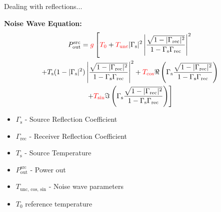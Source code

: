\documentclass[aspectratio=169]{beamer}
\begin{document}
\begin{frame}{\small{Dealing with reflections...}}
	\begin{minipage}{0.75\textwidth}
		\textbf{\small{Noise Wave Equation:}}
		{\tiny
			\begin{multline}
				P_{\text{out}}^{\text{src}} = \textcolor{red}{g} \left[ \textcolor{red}{T_0} + \textcolor{red}{T_{\text{unc}}} |\Gamma_{\text{s}}|^2 \left|\frac{ \sqrt{1 - |\Gamma_{\text{rec}}|^2}}{1 - \Gamma_{\text{s}}\Gamma_{\text{rec}}} \right|^2 \right. \\
					\left. + T_{\text{s}}(1 - |\Gamma_{\text{s}}|^2) \left|\frac{ \sqrt{1 - |\Gamma_{\text{rec}}|^2}}{1 - \Gamma_{\text{s}}\Gamma_{\text{rec}}} \right|^2 + \textcolor{red}{T_{\text{cos}}} \Re \left( \Gamma_{\text{s}} \frac{\sqrt{1 - |\Gamma_{\text{rec}}|^2}}{1 - \Gamma_{\text{s}} \Gamma_{\text{rec}}} \right) \right. \\
					\left. + \textcolor{red}{T_{\text{sin}}} \Im \left( \Gamma_{\text{s}} \frac{\sqrt{1 - |\Gamma_{\text{rec}}|^2}}{1 - \Gamma_{\text{s}} \Gamma_{\text{rec}}} \right) \right]
			\end{multline}
		}
	\end{minipage}
	\quad
	\begin{minipage}{0.2\textwidth}
		\tiny
		\begin{itemize}
			\item \( \Gamma_{\text{s}} \) - Source Reflection Coefficient
			\item \( \Gamma_{\text{rec}} \) - Receiver Reflection Coefficient
			\item \( T_{\text{s}} \) - Source Temperature
			\item $P_{\text{out}}^{\text{src}}$ - Power out
			\item $T_{\text{unc, cos, sin}}$ - Noise wave parameters
			\item $T_{0}$ reference temperature
		\end{itemize}
	\end{minipage}

\end{frame}
\end{document}
